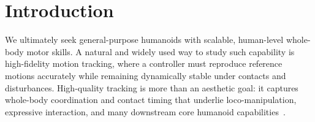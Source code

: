 \begin{abstract}
\end{abstract}
\IEEEpeerreviewmaketitle

\section{Introduction}
We ultimately seek general-purpose humanoids with scalable, human-level whole-body motor skills. A natural and widely used way to study such capability is high-fidelity motion tracking, where a controller must reproduce reference motions accurately while remaining dynamically stable under contacts and disturbances. High-quality tracking is more than an aesthetic goal: it captures whole-body coordination and contact timing that underlie loco-manipulation, expressive interaction, and many downstream core humanoid capabilities~\cite{zhao2025resmimic,yang2025omniretarget,yin2025visualmimic,allshire2025visual,su2025hitter,weng2025hdmi,yu2025skillmimic}.

